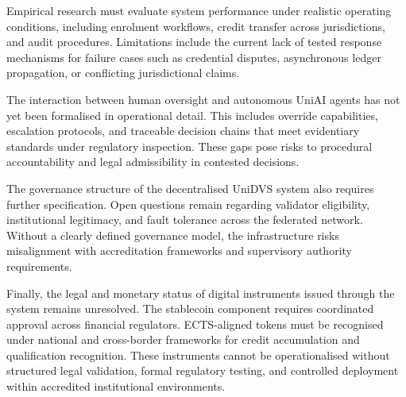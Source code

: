 \documentclass[oneside,10pt]{swissi}
\begin{document}
Empirical research must evaluate system performance under realistic operating conditions, including enrolment workflows, credit transfer across jurisdictions, and audit procedures. Limitations include the current lack of tested response mechanisms for failure cases such as credential disputes, asynchronous ledger propagation, or conflicting jurisdictional claims.

The interaction between human oversight and autonomous UniAI agents has not yet been formalised in operational detail. This includes override capabilities, escalation protocols, and traceable decision chains that meet evidentiary standards under regulatory inspection. These gaps pose risks to procedural accountability and legal admissibility in contested decisions.

The governance structure of the decentralised UniDVS system also requires further specification. Open questions remain regarding validator eligibility, institutional legitimacy, and fault tolerance across the federated network. Without a clearly defined governance model, the infrastructure risks misalignment with accreditation frameworks and supervisory authority requirements.

Finally, the legal and monetary status of digital instruments issued through the system remains unresolved. The stablecoin component requires coordinated approval across financial regulators. ECTS-aligned tokens must be recognised under national and cross-border frameworks for credit accumulation and qualification recognition. These instruments cannot be operationalised without structured legal validation, formal regulatory testing, and controlled deployment within accredited institutional environments.

\bigskip

\bigskip

\printbibliography

\swDeclarationsPage
\end{document}
